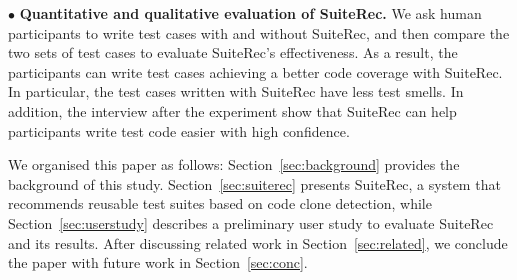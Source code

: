 \documentclass[conference]{IEEEtran}
\begin{document}
\noindent
$\bullet$ \textbf{Quantitative and qualitative evaluation of \textsf{SuiteRec}.} We ask human participants to write test cases with and without \textsf{SuiteRec}, and then compare the two sets of test cases to evaluate \textsf{SuiteRec}'s effectiveness. As a result, the participants can write test cases achieving a better code coverage with \textsf{SuiteRec}. In particular, the test cases written with \textsf{SuiteRec} have less test smells. In addition, the interview after the experiment show that \textsf{SuiteRec} can help participants write test code easier with high confidence.

We organised this paper as follows: Section~\ref{sec:background} provides the background of this study. Section~\ref{sec:suiterec} presents SuiteRec, a system that recommends reusable test suites based on code clone detection, while Section~\ref{sec:userstudy} describes a preliminary user study to evaluate \textsf{SuiteRec} and its results. After discussing related work in Section~\ref{sec:related}, we conclude the paper with future work in Section~\ref{sec:conc}.
\end{document}
